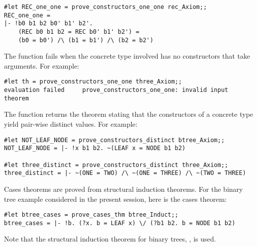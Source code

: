 {{\begin{session}
\begin{verbatim}
#let REC_one_one = prove_constructors_one_one rec_Axiom;;
REC_one_one = 
|- !b0 b1 b2 b0' b1' b2'.
    (REC b0 b1 b2 = REC b0' b1' b2') =
    (b0 = b0') /\ (b1 = b1') /\ (b2 = b2')
\end{verbatim}\end{session}

The function  fails when the concrete 
type involved has no constructors that take arguments.  For example:

\begin{session}\begin{verbatim}
#let th = prove_constructors_one_one three_Axiom;;
evaluation failed     prove_constructors_one_one: invalid input theorem
\end{verbatim}\end{session}

The function  returns the theorem stating
that the constructors of a concrete type yield pair-wise distinct values.  For
example:

\begin{session}\begin{verbatim}
#let NOT_LEAF_NODE = prove_constructors_distinct btree_Axiom;;
NOT_LEAF_NODE = |- !x b1 b2. ~(LEAF x = NODE b1 b2)

#let three_distinct = prove_constructors_distinct three_Axiom;;
three_distinct = |- ~(ONE = TWO) /\ ~(ONE = THREE) /\ ~(TWO = THREE)
\end{verbatim}\end{session}

Cases theorems are proved from structural induction theorems. For the binary
tree example considered in the present session, here is the cases theorem:

\begin{session}\begin{verbatim}
#let btree_cases = prove_cases_thm btree_Induct;;
btree_cases = |- !b. (?x. b = LEAF x) \/ (?b1 b2. b = NODE b1 b2)
\end{verbatim}\end{session}

\noindent Note that the structural induction theorem for binary trees, 
, is used.

}}
